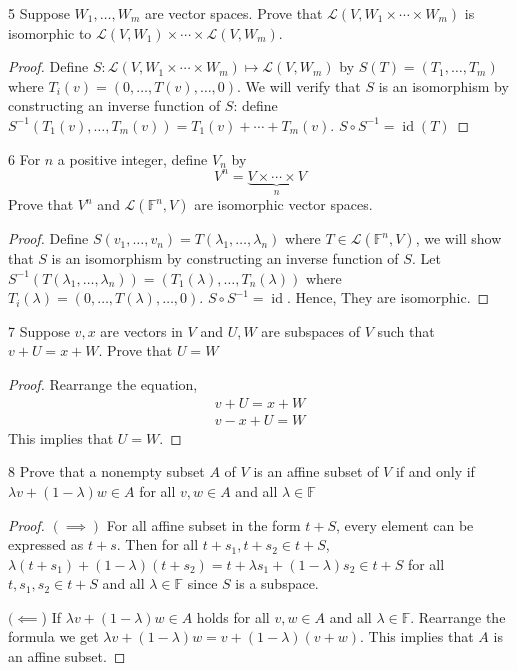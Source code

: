 \documentclass{article}
\newenvironment{problem}[1]{\begin{prob*}{#1}{}}{\end{prob*}}
\begin{document}
\begin{problem}{5}
Suppose $W_1, \ldots , W_m$ are vector spaces. Prove that $\mathcal{L}(V, W_1 \times \cdots \times W_m)$ is isomorphic to $\mathcal{L}(V, W_1) \times \cdots \times \mathcal{L}(V, W_m)$.
\end{problem}
\begin{proof}
Define $S: \mathcal{L}(V, W_1\times \cdots\times W_m) \mapsto \mathcal{L}(V,W_m)$ by $S(T) = (T_1, \ldots ,T_m)$ where $T_i(v) = (0, \ldots ,T(v), \ldots ,0)$. We will verify that $S$ is an isomorphism by constructing an inverse function of $S$: define
$S^{-1} (T_1(v), \ldots , T_m(v)) = T_1(v) + \cdots + T_m(v)$. $S \circ S^{-1} = \operatorname{id}(T)$
\end{proof}

\begin{problem}{6}
For $n $ a positive integer, define $V_n $ by \[
	V^n = \underbrace{ V \times \cdots \times V }_{n}\]
Prove that $V^n$ and $\mathcal{L}(\mathbb{F}^n, V)$ are isomorphic vector spaces.
\end{problem}
\begin{proof}
Define $S(v_1, \ldots ,v_n) = T(\lambda_1, \ldots , \lambda_n)$ where $T \in \mathcal{L}(\mathbb{F}^n, V)$, we will show that $S$ is an isomorphism by constructing an inverse function of $S$. Let $S^{-1} (T(\lambda_1, \ldots ,\lambda_n)) = (T_1(\lambda), \ldots , T_n(\lambda))$ where $T_i(\lambda) = (0, \ldots, T(\lambda), \ldots , 0)$. $S \circ S^{-1} = \operatorname{id}$. Hence, They are isomorphic.
\end{proof}

\begin{problem}{7}
Suppose $v,x$ are vectors in $V$ and $U, W$ are subspaces of $V$ such that $v + U = x + W$. Prove that $U = W$
\end{problem}
\begin{proof}
Rearrange the equation,
\begin{align}
v + U = x + W \\
v - x + U = W
\end{align}
This implies that $U = W$.
\end{proof}

\begin{problem}{8}
Prove that a nonempty subset $A $ of $V$ is an affine subset of $V$ if and only if
$\lambda v + (1 - \lambda)w \in A$ for all $v, w \in A$ and all $\lambda \in \mathbb{F}$
\end{problem}
\begin{proof}
$(\implies)$ For all affine subset in the form $t + S$, every element can be expressed as $t + s$. Then for all $t + s_1, t + s_2 \in t + S$, $\lambda (t + s_1) + (1 - \lambda)(t + s_2) = t + \lambda s_1 + (1 - \lambda)s_2 \in t + S$ for all $t, s_1, s_2 \in t + S$ and all $\lambda \in \mathbb{F}$ since $S $ is a subspace. \par
$(\impliedby$) If $\lambda v + (1 - \lambda)w \in A$ holds for all $v, w \in A$ and all $\lambda \in \mathbb{F}$. Rearrange the formula we get $\lambda v + (1 - \lambda)w = v + (1 - \lambda)(v+w)$. This implies that $A$ is an affine subset.
\end{proof}
\end{document}
